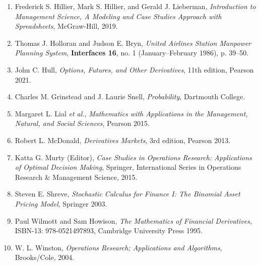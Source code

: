 \documentclass[letterpaper,10pt]{article}
\begin{document}
\begin{enumerate}

\item Frederick S. Hillier, Mark S. Hillier, and Gerald J. Lieberman, {\em Introduction to Management Science, A Modeling and Case Studies Approach with Spreadsheets}, McGraw-Hill, 2019.

\item Thomas J. Holloran and Judson E. Bryn, {\em United Airlines Station Manpower Planning System}, {\bf Interfaces 16}, no. 1 (January--February 1986), p. 39--50.

\item John C. Hull, {\em Options, Futures, and Other Derivatives}, 11th edition, Pearson 2021.

\item Charles M. Grinstead and J. Laurie Snell, {\em Probability}, Dartmouth College.

\item Margaret L. Lial {\em et al.}, {\em Mathematics with Applications in the Management, Natural, and Social Sciences}, Pearson 2015.

\item Robert L. McDonald, {\em Derivatives Markets}, 3rd edition, Pearson 2013.

\item Katta G. Murty (Editor), {\em Case Studies in Operations Research:  Applications of Optimal Decision Making}, Springer, International Series in Operations Research \& Management Science, 2015.


\item Steven E. Shreve, {\em Stochastic Calculus for Finance I: The Binomial Asset Pricing Model}, Springer 2003.


\item Paul Wilmott and Sam Howison, {\em The Mathematics of Financial Derivatives}, ISBN-13: 978-0521497893, Cambridge University Press 1995.


\item W. L. Winston, {\em Operations Research; Applications and Algorithms}, Brooks/Cole, 2004.



\end{enumerate}





 
\end{document}
